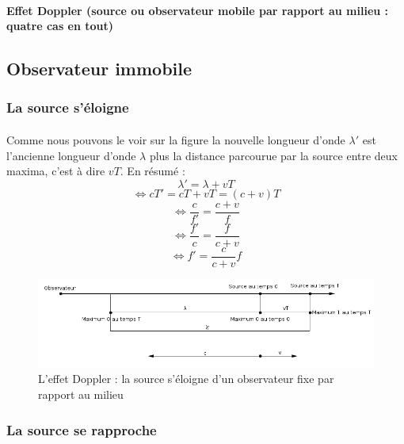 \documentclass[a4paper]{article}
\begin{document}
\paragraph{}\textbf{Effet Doppler (source ou observateur mobile par rapport au milieu : quatre cas en tout)}
\subsection{Observateur immobile}
\subsubsection{La source s'éloigne}
\paragraph{}Comme nous pouvons le voir sur la figure la nouvelle longueur d'onde $\lambda'$ est l'ancienne longueur d'onde $\lambda$ plus la distance parcourue par la source entre deux maxima, c'est à dire $vT$. En résumé :
\[\lambda'=\lambda+vT\]
\[\Leftrightarrow cT'=cT+vT=(c+v)T\]
\[\Leftrightarrow \frac{c}{f'}=\frac{c+v}{f}\]
\[\Leftrightarrow \frac{f'}{c}=\frac{f}{c+v}\]
\[\Leftrightarrow f'=\frac{c}{c+v}f\]
\begin{figure}
\begin{center}
\includegraphics[width=15cm]{imgs/OfSe.png}
\end{center}
\caption{L'effet Doppler : la source s'éloigne d'un observateur fixe par rapport au milieu}
\label{L'effet Doppler : la source s'éloigne d'un observateur fixe par rapport au milieu}
\end{figure}
\subsubsection{La source se rapproche}
\end{document}
